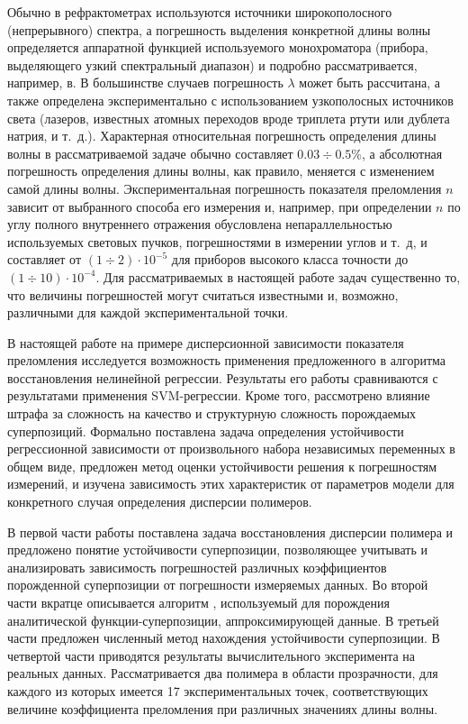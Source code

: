 \documentclass[11pt,a4paper]{article}
\theoremstyle{definition}
\begin{document}
Обычно в рефрактометрах используются источники широкополосного (непрерывного)
спектра, а погрешность выделения конкретной длины волны определяется аппаратной
функцией используемого монохроматора (прибора, выделяющего узкий спектральный
диапазон) и подробно рассматривается, например, в\cite{Malishev79,Zaidel72}.
В большинстве случаев погрешность $\lambda$ может быть рассчитана, а также
определена экспериментально с использованием узкополосных источников света
(лазеров, известных атомных переходов вроде триплета ртути или дублета натрия,
и т.~д.). Характерная относительная погрешность определения длины волны в
рассматриваемой задаче обычно составляет $0.03 \div 0.5\%$, а 
абсолютная погрешность определения длины волны, как правило, меняется с
изменением самой длины волны. Экспериментальная погрешность показателя
преломления $n$ зависит от выбранного способа его измерения и, например,
при определении $n$ по углу полного внутреннего отражения обусловлена
непараллельностью используемых световых пучков, погрешностями в измерении углов
и т.~д, и составляет от $(1 \div 2) \cdot 10^{-5}$ для приборов высокого класса
точности до $(1 \div 10) \cdot 10^{-4}$. Для рассматриваемых в настоящей работе
задач существенно то, что величины погрешностей могут считаться известными и,
возможно, различными для каждой экспериментальной точки.

В настоящей работе на примере дисперсионной зависимости показателя преломления
исследуется возможность применения предложенного в \cite{Rudoy13} алгоритма
восстановления нелинейной регрессии. Результаты его работы сравниваются с
результатами применения SVM-регрессии. Кроме того, рассмотрено влияние штрафа
за сложность на качество и структурную сложность порождаемых суперпозиций.
Формально поставлена задача определения устойчивости регрессионной зависимости
от произвольного набора независимых переменных в общем виде, предложен метод
оценки устойчивости решения к погрешностям измерений, и изучена зависимость
этих характеристик от параметров модели для конкретного случая определения
дисперсии полимеров.

В первой части работы поставлена задача восстановления дисперсии полимера и
предложено понятие устойчивости суперпозиции, позволяющее учитывать и анализировать
зависимость погрешностей различных коэффициентов порожденной суперпозиции от
погрешности измеряемых данных.
Во второй части вкратце описывается алгоритм \cite{Rudoy13},
используемый для порождения аналитической функции-суперпозиции, аппроксимирующей
данные. В третьей части предложен численный метод нахождения устойчивости
суперпозиции. В четвертой части приводятся результаты вычислительного
эксперимента на реальных данных. Рассматривается два полимера в области прозрачности,
для каждого из которых имеется 17 экспериментальных точек,
соответствующих величине коэффициента преломления при различных значениях длины волны.
\end{document}
